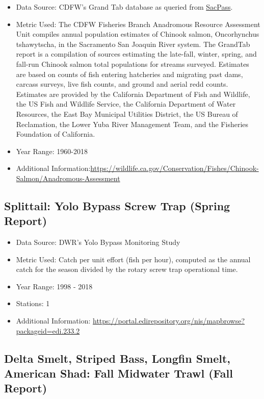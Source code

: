 \documentclass[
]{book}
\providecommand{\tightlist}{%
  \setlength{\itemsep}{0pt}\setlength{\parskip}{0pt}}
\begin{document}
\begin{itemize}
\tightlist
\item
  Data Source: CDFW's Grand Tab database as queried from \href{http://www.cbr.washington.edu/sacramento/data/query_adult_grandtab.html}{SacPass}.
\item
  Metric Used: The CDFW Fisheries Branch Anadromous Resource Assessment Unit compiles annual population estimates of Chinook salmon, Oncorhynchus tshawytscha, in the Sacramento San Joaquin River system. The GrandTab report is a compilation of sources estimating the late-fall, winter, spring, and fall-run Chinook salmon total populations for streams surveyed. Estimates are based on counts of fish entering hatcheries and migrating past dams, carcass surveys, live fish counts, and ground and aerial redd counts. Estimates are provided by the California Department of Fish and Wildlife, the US Fish and Wildlife Service, the California Department of Water Resources, the East Bay Municipal Utilities District, the US Bureau of Reclamation, the Lower Yuba River Management Team, and the Fisheries Foundation of California.
\item
  Year Range: 1960-2018
\item
  Additional Information:\url{https://wildlife.ca.gov/Conservation/Fishes/Chinook-Salmon/Anadromous-Assessment}
\end{itemize}

\hypertarget{splittail-yolo-bypass-screw-trap-spring-report}{%
\subsection{Splittail: Yolo Bypass Screw Trap (Spring Report)}\label{splittail-yolo-bypass-screw-trap-spring-report}}

\begin{itemize}
\tightlist
\item
  Data Source: DWR's Yolo Bypass Monitoring Study
\item
  Metric Used: Catch per unit effort (fish per hour), computed as the annual catch for the season divided by the rotary screw trap operational time.
\item
  Year Range: 1998 - 2018
\item
  Stations: 1
\item
  Additional Information: \url{https://portal.edirepository.org/nis/mapbrowse?packageid=edi.233.2}
\end{itemize}

\hypertarget{delta-smelt-striped-bass-longfin-smelt-american-shad-fall-midwater-trawl-fall-report}{%
\subsection{Delta Smelt, Striped Bass, Longfin Smelt, American Shad: Fall Midwater Trawl (Fall Report)}\label{delta-smelt-striped-bass-longfin-smelt-american-shad-fall-midwater-trawl-fall-report}}
\end{document}
